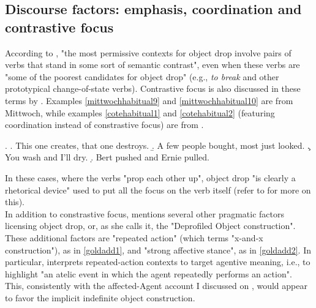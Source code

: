\subsection{Discourse factors: emphasis, coordination and contrastive focus} 

According to \textcite[251-252]{Mittwoch2005}, "the most permissive contexts for object drop involve pairs of verbs that stand in some sort of semantic contrast", even when these verbs are "some of the poorest candidates for object drop" (e.g., \textit{to break} and other prototypical change-of-state verbs). Contrastive focus is also discussed in these terms by \textcite{Dixon1992}. Examples \ref{mittwochhabitual9} and \ref{mittwochhabitual10} are from Mittwoch, while examples \ref{cotehabitual1} and \ref{cotehabitual2} (featuring coordination instead of constrastive focus) are from \textcite[112, 143]{Cote1996}.

\ex. \label{mittwochhabitualD} \a. \label{mittwochhabitual9} This one creates, that one destroys.
\b. \label{mittwochhabitual10} A few people bought, most just looked.
\c. \label{cotehabitual1} You wash and I'll dry.
\d. \label{cotehabitual2} Bert pushed and Ernie pulled.


In these cases, where the verbs "prop each other up", object drop "is clearly a rhetorical device" used to put all the focus on the verb itself (refer to  for more on this).\\
In addition to constrastive focus, \textcite[196-197]{goldberg2006constructions} mentions several other pragmatic factors licensing object drop, or, as she calls it, the "Deprofiled Object construction". These additional factors are "repeated action" (which \textcite{Rissman2016} terms "x-and-x construction"), as in \ref{goldadd1}, and "strong affective stance", as in \ref{goldadd2}. In particular, \textcite{Rissman2016} interprets repeated-action contexts to target agentive meaning, i.e., to highlight "an atelic event in which the agent repeatedly performs an action". This, consistently with the affected-Agent account I discussed on , would appear to favor the implicit indefinite object construction.

